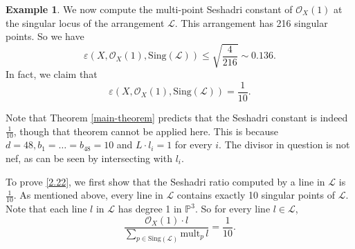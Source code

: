 \documentclass[12pt,reqno]{amsart}
\theoremstyle{plain}
\numberwithin{equation}{section}
\theoremstyle{definition}
\newtheorem{example}[theorem]{Example}
\begin{document}
\begin{example}


		
		We now compute the multi-point Seshadri constant of $\mathcal{O}_X(1)$ at the singular locus of 
		the arrangement $\mathcal{L}$.  This arrangement has 216 singular points. So we have 
		$$\varepsilon(X, \mathcal{O}_X(1), \text{Sing}(\mathcal{L})) \le \sqrt{\frac{4}{216}} \sim 0.136.$$
In fact, we claim that
		\begin{equation}\label{2.22}
		\varepsilon(X, \mathcal{O}_X(1), \text{Sing}(\mathcal{L})) = \frac{1}{10}.
	\end{equation}

Note that Theorem \ref{main-theorem} predicts that the Seshadri constant is indeed $\frac{1}{10}$, though that theorem cannot be applied here. This is because 
$d=48, b_1=\dots = b_{48} = 10$ and $L\cdot l_i = 1$ for every $i$. The divisor
in question is not nef, as can be seen by intersecting with $l_i$. 


  To prove \eqref{2.22}, we first show that the Seshadri ratio computed by a line in $\mathcal{L}$ is $\frac{1}{10}$. 
   As mentioned above, every line in $\mathcal{L}$ contains exactly 10 singular points of $\mathcal{L}$. 
   Note that each line $l$ in $\mathcal{L}$ has degree 1 in $\mathbb{P}^3$.
   So for every line $l \in \mathcal{L}$, 
		\[
		\frac{\mathcal{O}_X(1)\cdot l}{ \sum\limits_{p \in\text{Sing}(\mathcal{L})} \text{mult}_{p} \,l} %
		= \frac{1}{10}.
		\]
  

\end{example}
\end{document}
